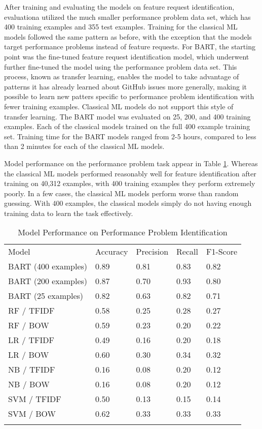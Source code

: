 After training and evaluating the models on feature request identification, evaluationa utilized the much smaller performance problem data set, which has 400 training examples and 355 test examples. Training for the classical ML models followed the same pattern as before, with the exception that the models target performance problems instead of feature requests. For BART, the starting point was the fine-tuned feature request identification model, which underwent further fine-tuned the model using the performance problem data set. This process, known as transfer learning, enables the model to take advantage of patterns it has already learned about GitHub issues more generally, making it possible to learn new patters specific to performance problem identification with fewer training examples. Classical ML models do not support this style of transfer learning. The BART model was evaluated on 25, 200, and 400 training examples. Each of the classical models trained on the full 400 example training set. Training time for the BART models ranged from 2-5 hours, compared to less than 2 minutes for each of the classical ML models.

Model performance on the performance problem task appear in Table \ref{performance_results}. Whereas the classical ML models performed reasonably well for feature identification after training on 40,312 examples, with 400 training examples they perform extremely poorly. In a few cases, the classical ML models perform worse than random guessing. With 400 examples, the classical models simply do not having enough training data to learn the task effectively. 

\begin{table}
\caption{Model Performance on Performance Problem Identification}
\label{performance_results}
\begin{tabular}{lllll}
\hline\noalign{\smallskip}
Model & Accuracy & Precision & Recall & F1-Score  \\
\noalign{\smallskip}\hline\noalign{\smallskip}
BART (400 examples) & 0.89 & 0.81 & 0.83 & 0.82 \\
BART (200 examples) & 0.87 & 0.70 & 0.93 & 0.80 \\
BART (25 examples) & 0.82 & 0.63 & 0.82 & 0.71 \\
RF / TFIDF  & 0.58 & 0.25 & 0.28 & 0.27 \\
RF / BOW  & 0.59 & 0.23 & 0.20 & 0.22 \\
LR / TFIDF & 0.49 & 0.16 & 0.20 & 0.18 \\
LR / BOW & 0.60 & 0.30 & 0.34 & 0.32 \\
NB / TFIDF & 0.16 & 0.08 & 0.20 & 0.12 \\
NB / BOW & 0.16 &  0.08 & 0.20 & 0.12 \\
SVM / TFIDF & 0.50 & 0.13 & 0.15 & 0.14 \\
SVM / BOW & 0.62 & 0.33 & 0.33 & 0.33 \\
\noalign{\smallskip}\hline
\end{tabular}
\end{table}


